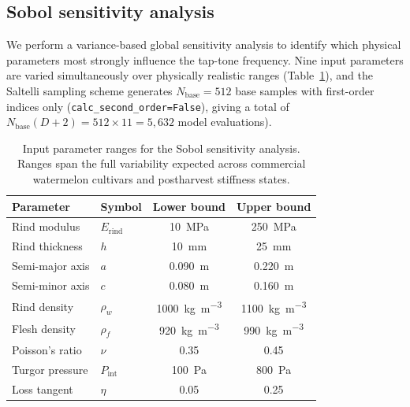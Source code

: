 \subsection{Sobol sensitivity analysis}
\label{sec:sobol}

We perform a variance-based global sensitivity analysis
\cite{Sobol2001, Saltelli2002} to identify which physical parameters
most strongly influence the tap-tone frequency.  Nine input parameters
are varied simultaneously over physically realistic ranges
(Table~\ref{tab:sobol_inputs}), and the Saltelli sampling scheme
generates $N_{\mathrm{base}} = 512$ base samples with first-order
indices only (\texttt{calc\_second\_order=False}), giving a total of $N_{\mathrm{base}} (D + 2) = 512 \times 11 = 5{,}632$ model evaluations).

\begin{table}[t]
  \centering
  \caption{Input parameter ranges for the Sobol sensitivity analysis.
    Ranges span the full variability expected across commercial
    watermelon cultivars and postharvest stiffness states.}
  \label{tab:sobol_inputs}
  \begin{tabular}{llcc}
    \toprule
    Parameter & Symbol & Lower bound & Upper bound \\
    \midrule
    Rind modulus    & $E_{\mathrm{rind}}$ & \SI{10}{\mega\pascal}   & \SI{250}{\mega\pascal} \\
    Rind thickness  & $h$                 & \SI{10}{\milli\metre}   & \SI{25}{\milli\metre}  \\
    Semi-major axis & $a$                 & \SI{0.090}{\metre}      & \SI{0.220}{\metre}     \\
    Semi-minor axis & $c$                 & \SI{0.080}{\metre}      & \SI{0.160}{\metre}     \\
    Rind density    & $\rho_w$            & \SI{1000}{\kilogram\per\metre\cubed} & \SI{1100}{\kilogram\per\metre\cubed} \\
    Flesh density   & $\rho_f$            & \SI{920}{\kilogram\per\metre\cubed}  & \SI{990}{\kilogram\per\metre\cubed}  \\
    Poisson's ratio & $\nu$               & 0.35  & 0.45  \\
    Turgor pressure & $P_{\mathrm{int}}$  & \SI{100}{\pascal} & \SI{800}{\pascal} \\
    Loss tangent    & $\eta$              & 0.05  & 0.25  \\
    \bottomrule
  \end{tabular}
\end{table}

